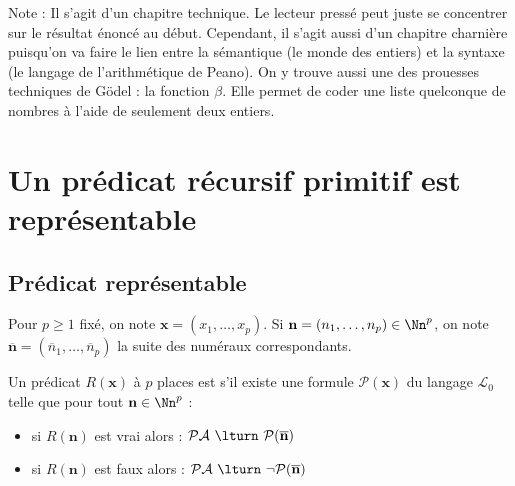 \documentclass[11pt,class=report,crop=false]{standalone}
\begin{document}







Note : Il s'agit d'un chapitre technique. Le lecteur pressé peut juste se concentrer sur le résultat énoncé au début.
Cependant, il s'agit aussi d'un chapitre charnière puisqu'on va faire le lien entre la sémantique (le monde des entiers) et la syntaxe (le langage de l'arithmétique de Peano).
On y trouve aussi une des prouesses techniques de Gödel : la fonction $\beta$. Elle permet de coder une liste quelconque de nombres à l'aide de seulement deux entiers.

\section{Un prédicat récursif primitif est représentable}

\subsection{Prédicat représentable}

Pour $p \ge 1$ fixé, on note $\mathbf{x} = (x_1, \dots, x_p)$.
Si $\mathbf{n} = (n_1, \dots, n_p) \in \Nn^p$, on note $\overline{\mathbf{n}} = (\overline{n}_1, \dots, \overline{n}_p)$ la suite des numéraux correspondants.

\begin{definition}
    Un prédicat $R(\mathbf{x})$ à $p$ places est  s'il existe une formule $\mathcal{P}(\mathbf{x})$ du langage $\mathcal{L}_0$ telle que pour tout $\mathbf{n} \in \Nn^p$ :
    \begin{itemize}
        \item si $R(\mathbf{n})$ est vrai alors : \quad $\mathcal{PA} \ \lturn \ \mathcal{P}(\overline{\mathbf{n}})$
        \item si $R(\mathbf{n})$ est faux alors : \quad $\mathcal{PA} \ \lturn \  \lnot \mathcal{P}(\overline{\mathbf{n}})$
    \end{itemize}
\end{definition}
\end{document}
